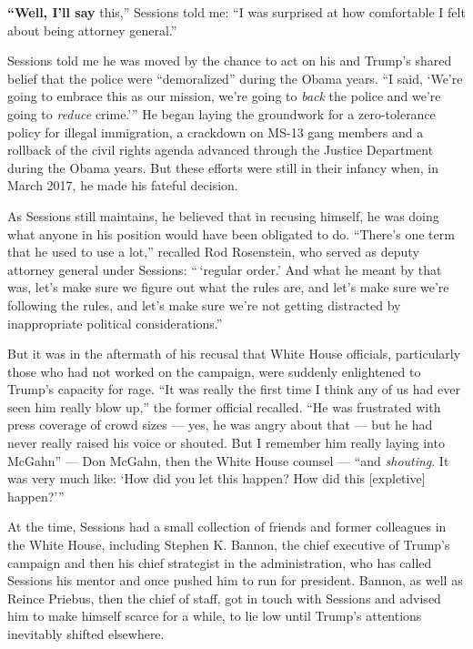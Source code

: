 \textbf{``Well, I'll say} this,'' Sessions told me: ``I was surprised at
how comfortable I felt about being attorney general.''

Sessions told me he was moved by the chance to act on his and Trump's
shared belief that the police were ``demoralized'' during the Obama
years. ``I said, `We're going to embrace this as our mission, we're
going to \emph{back} the police and we're going to \emph{reduce}
crime.''' He began laying the groundwork for a zero-tolerance policy for
illegal immigration, a crackdown on MS-13 gang members and a rollback of
the civil rights agenda advanced through the Justice Department during
the Obama years. But these efforts were still in their infancy when, in
March 2017, he made his fateful decision.

As Sessions still maintains, he believed that in recusing himself, he
was doing what anyone in his position would have been obligated to do.
``There's one term that he used to use a lot,'' recalled Rod Rosenstein,
who served as deputy attorney general under Sessions: `` `regular
order.' And what he meant by that was, let's make sure we figure out
what the rules are, and let's make sure we're following the rules, and
let's make sure we're not getting distracted by inappropriate political
considerations.''

But it was in the aftermath of his recusal that White House officials,
particularly those who had not worked on the campaign, were suddenly
enlightened to Trump's capacity for rage. ``It was really the first time
I think any of us had ever seen him really blow up,'' the former
official recalled. ``He was frustrated with press coverage of crowd
sizes --- yes, he was angry about that --- but he had never really
raised his voice or shouted. But I remember him really laying into
McGahn'' --- Don McGahn, then the White House counsel --- ``and
\emph{shouting}. It was very much like: `How did you let this happen?
How did this {[}expletive{]} happen?'''

At the time, Sessions had a small collection of friends and former
colleagues in the White House, including Stephen K. Bannon, the chief
executive of Trump's campaign and then his chief strategist in the
administration, who has called Sessions his mentor and once pushed him
to run for president. Bannon, as well as Reince Priebus, then the chief
of staff, got in touch with Sessions and advised him to make himself
scarce for a while, to lie low until Trump's attentions inevitably
shifted elsewhere.

